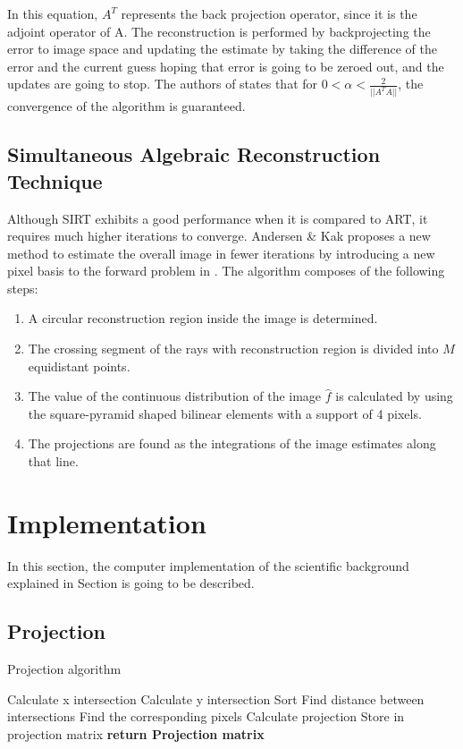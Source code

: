 \documentclass[journal]{IEEEtran}
\begin{document}
In this equation, $A^T$ represents the back projection operator, since it is the adjoint operator of A. The reconstruction is performed by backprojecting the error to image space and updating the estimate by taking the difference of the error and the current guess hoping that error is going to be zeroed out, and the updates are going to stop. 
The authors of \cite*{dong2020accelerated} states that for $0<\alpha<\frac{2}{||A^TA||}$, the convergence of the algorithm is guaranteed. 

\subsection{Simultaneous Algebraic Reconstruction Technique}

Although SIRT exhibits a good performance when it is compared to ART, it requires much higher iterations to converge. Andersen \& Kak proposes a new method to estimate the overall image in fewer iterations by introducing a new pixel basis to the forward problem in \cite*{andersen1984sart}. The algorithm composes of the following steps:
\begin{enumerate}
	\item A circular reconstruction region inside the image is determined. 
	\item The crossing segment of the rays with reconstruction region is divided into $M$ equidistant points.
	\item The value of the continuous distribution of the image $\hat{f}$ is calculated by using the square-pyramid shaped bilinear elements with a support of 4 pixels.
	\item The projections are found as the integrations of the image estimates along that line. 
\end{enumerate}

\newpage

\section{Implementation} \label{sec:implementation}

In this section, the computer implementation of the scientific background explained in Section  is going to be described.

\subsection{Projection}
\begin{algorithm}[h]
\caption{Projection algorithm}
\begin{algorithmic}
		\State Calculate x intersection
		\State Calculate y intersection
		\State Sort 
		\State Find distance between intersections 
		\State Find the corresponding pixels
		\State Calculate projection 
		\State Store in projection matrix
	  \EndFor
   \EndFor
   \State \textbf{return Projection matrix}
\EndProcedure
\label{alg:projection}
\end{algorithmic}
\end{algorithm}
\end{document}
